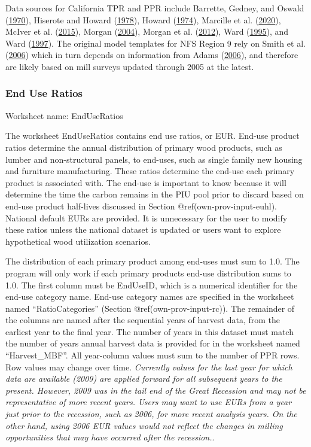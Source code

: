 \documentclass[
  openany]{book}
\begin{document}
Data sources for California TPR and PPR include Barrette, Gedney, and
Oswald (\protect\hyperlink{ref-barrette1970}{1970}), Hiserote and Howard
(\protect\hyperlink{ref-hiserote1978}{1978}), Howard
(\protect\hyperlink{ref-howard1974}{1974}), Marcille et al.
(\protect\hyperlink{ref-marcille2020}{2020}), McIver et al.
(\protect\hyperlink{ref-mciver2015}{2015}), Morgan
(\protect\hyperlink{ref-morgan2004}{2004}), Morgan et al.
(\protect\hyperlink{ref-morgan2012}{2012}), Ward
(\protect\hyperlink{ref-ward1995}{1995}), and Ward
(\protect\hyperlink{ref-ward1997}{1997}). The original model templates
for NFS Region 9 rely on Smith et al.
(\protect\hyperlink{ref-smith2006}{2006}) which in turn depends on
information from Adams (\protect\hyperlink{ref-adams2006}{2006}), and
therefore are likely based on mill surveys updated through 2005 at the
latest.

\hypertarget{own-prov-input-eur}{%
\subsubsection{End Use Ratios}\label{own-prov-input-eur}}

Worksheet name: EndUseRatios

The worksheet EndUseRatios contains end use ratios, or EUR. End-use
product ratios determine the annual distribution of primary wood
products, such as lumber and non-structural panels, to end-uses, such as
single family new housing and furniture manufacturing. These ratios
determine the end-use each primary product is associated with. The
end-use is important to know because it will determine the time the
carbon remains in the PIU pool prior to discard based on end-use product
half-lives discussed in Section @ref(own-prov-input-euhl). National
default EURs are provided. It is unnecessary for the user to modify
these ratios unless the national dataset is updated or users want to
explore hypothetical wood utilization scenarios.

The distribution of each primary product among end-uses must sum to 1.0.
The program will only work if each primary products end-use distribution
sums to 1.0. The first column must be EndUseID, which is a numerical
identifier for the end-use category name. End-use category names are
specified in the worksheet named ``RatioCategories'' (Section
@ref(own-prov-input-rc)). The remainder of the columns are named after
the sequential years of harvest data, from the earliest year to the
final year. The number of years in this dataset must match the number of
years annual harvest data is provided for in the worksheet named
``Harvest\_MBF''. All year-column values must sum to the number of PPR
rows. Row values may change over time. \emph{Currently values for the
last year for which data are available (2009) are applied forward for
all subsequent years to the present. However, 2009 was in the tail end
of the Great Recession and may not be representative of more recent
years. Users may want to use EURs from a year just prior to the
recession, such as 2006, for more recent analysis years. On the other
hand, using 2006 EUR values would not reflect the changes in milling
opportunities that may have occurred after the recession.}.
\end{document}
